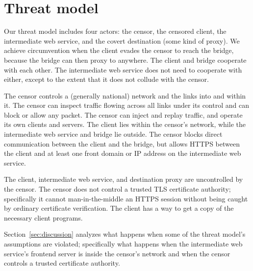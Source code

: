 \documentclass{sig-alternate}
\begin{document}
\section{Threat model}
\label{sec:threatmodel}

Our threat model includes four actors:
the censor,
the censored client,
the intermediate web service,
and the covert destination (some kind of proxy).
We achieve
circumvention when the client evades the censor to reach
the bridge,
because the bridge can then proxy to anywhere.
The client and bridge cooperate with each other.
The intermediate web service does not need to cooperate with either,
except to the extent that it does not collude with the censor.

The censor controls a (generally national)
network and the links into and within it.
The censor can inspect traffic flowing across all links under its control
and can block or allow any packet.
The censor can inject and replay traffic, and
operate its own clients and servers.
The client lies within the censor's network,
while the intermediate web service and bridge lie outside.
The censor blocks direct communication between the client and the bridge,
but allows HTTPS between the client and at least one front domain or IP address
on the intermediate web service.


The client,
intermediate web service,
and destination proxy
are uncontrolled by the censor.
The censor does not control a trusted TLS certificate authority;
specifically it cannot man-in-the-middle an HTTPS session
without being caught by ordinary certificate verification.
The client has a way to get a copy of the necessary client programs.

Section~\ref{sec:discussion} analyzes what happens when some
of the threat model's assumptions are violated;
specifically what happens
when the intermediate web service's frontend server is inside the censor's network
and when the censor controls a trusted certificate authority.
\end{document}

